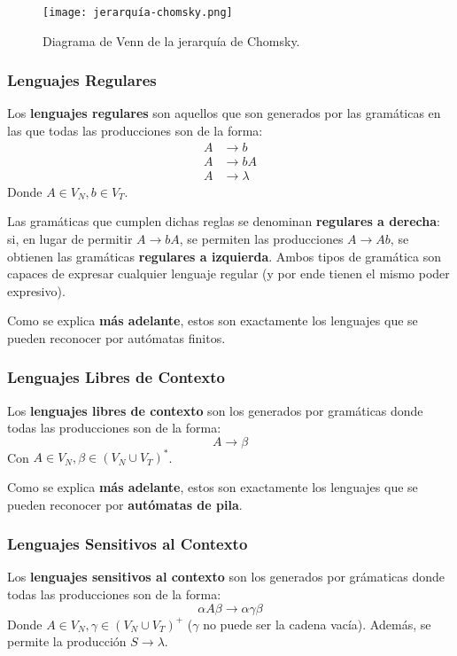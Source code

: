\begin{figure}[H]
    \centering
    \texttt{[image: jerarquía-chomsky.png]}
    \caption*{Diagrama de Venn de la jerarquía de Chomsky.}
\end{figure}

\subsubsection{Lenguajes Regulares}
\label{lenguaje-regular}

Los \textbf{lenguajes regulares} son aquellos que son generados por las gramáticas en las que todas las producciones son de la forma:
$$
\begin{aligned}
    A & \to b \\
    A & \to b A \\
    A & \to \lambda
\end{aligned}
$$
Donde $A \in V_N, b \in V_T$.

Las gramáticas que cumplen dichas reglas se denominan \textbf{regulares a derecha}: si, en lugar de permitir $A \to b A$, se permiten las producciones $A \to A b$, se obtienen las gramáticas \textbf{regulares a izquierda}. Ambos tipos de gramática son capaces de expresar cualquier lenguaje regular (y por ende tienen el mismo poder expresivo).

Como se explica \textbf{más adelante}, estos son exactamente los lenguajes que se pueden reconocer por autómatas finitos.

\subsubsection{Lenguajes Libres de Contexto}

Los \textbf{lenguajes libres de contexto} son los generados por gramáticas donde todas las producciones son de la forma:
$$A \to \beta$$
Con $A \in V_N, \beta \in (V_N \cup V_T)^*$.

Como se explica \textbf{más adelante}, estos son exactamente los lenguajes que se pueden reconocer por \textbf{autómatas de pila}.

\subsubsection{Lenguajes Sensitivos al Contexto}

Los \textbf{lenguajes sensitivos al contexto} son los generados por grámaticas donde todas las producciones son de la forma:
$$\alpha A \beta \to \alpha \gamma \beta$$
Donde $A \in V_N, \gamma \in (V_N \cup V_T)^+$ ($\gamma$ no puede ser la cadena vacía). Además, se permite la producción $S \to \lambda$.

